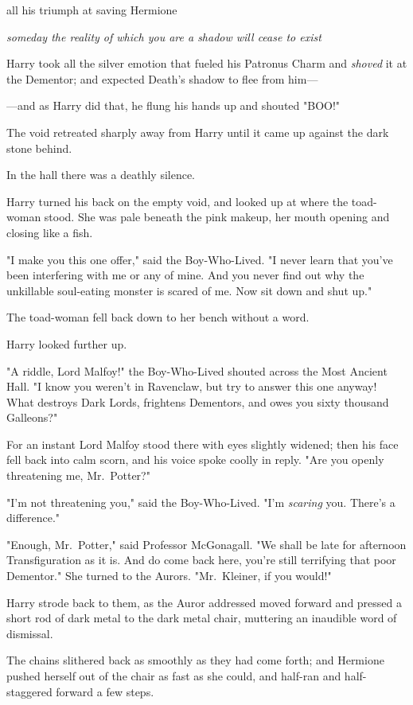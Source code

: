 all his triumph at saving Hermione

\emph{someday the reality of which you are a shadow will cease to exist}

Harry took all the silver emotion that fueled his Patronus Charm and 
\emph{shoved} it at the Dementor; and expected Death's shadow to flee from 
him---

---and as Harry did that, he flung his hands up and shouted "BOO!"

The void retreated sharply away from Harry until it came up against the dark 
stone behind.

In the hall there was a deathly silence.

Harry turned his back on the empty void, and looked up at where the toad-woman 
stood. She was pale beneath the pink makeup, her mouth opening and closing like 
a fish.

"I make you this one offer," said the Boy-Who-Lived. "I never learn that you've 
been interfering with me or any of mine. And you never find out why the 
unkillable soul-eating monster is scared of me. Now sit down and shut up."

The toad-woman fell back down to her bench without a word.

Harry looked further up.

"A riddle, Lord Malfoy!" the Boy-Who-Lived shouted across the Most Ancient 
Hall. "I know you weren't in Ravenclaw, but try to answer this one anyway! What 
destroys Dark Lords, frightens Dementors, and owes you sixty thousand Galleons?"

For an instant Lord Malfoy stood there with eyes slightly widened; then his 
face fell back into calm scorn, and his voice spoke coolly in reply. "Are you 
openly threatening me, Mr.~Potter?"

"I'm not threatening you," said the Boy-Who-Lived. "I'm \emph{scaring} you. 
There's a difference."

"Enough, Mr.~Potter," said Professor McGonagall. "We shall be late for 
afternoon Transfiguration as it is. And do come back here, you're still 
terrifying that poor Dementor." She turned to the Aurors. "Mr.~Kleiner, if you 
would!"

Harry strode back to them, as the Auror addressed moved forward and pressed a 
short rod of dark metal to the dark metal chair, muttering an inaudible word of 
dismissal.

The chains slithered back as smoothly as they had come forth; and Hermione 
pushed herself out of the chair as fast as she could, and half-ran and 
half-staggered forward a few steps.

